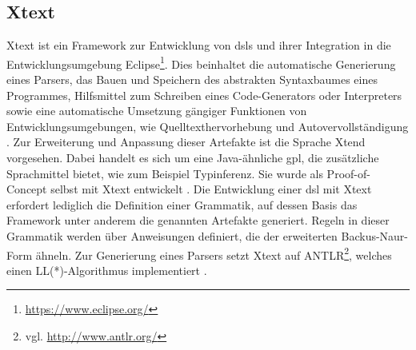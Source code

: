\subsection{Xtext}
    \label{section:solutionDetailsDslXtext}
    Xtext ist ein Framework zur Entwicklung von \glspl{dsl} und ihrer Integration
    in die Entwicklungsumgebung Eclipse\footnote{\url{https://www.eclipse.org/}}.
    Dies beinhaltet die automatische Generierung eines Parsers,
    das Bauen und Speichern des abstrakten Syntaxbaumes eines Programmes,
    Hilfsmittel zum Schreiben eines Code-Generators oder Interpreters
    sowie eine automatische Umsetzung gängiger Funktionen von
    Entwicklungsumgebungen, wie Quelltexthervorhebung und Autovervollständigung
    \cite[Kapitel 1]{bettini:xtext}.
    Zur Erweiterung und Anpassung dieser Artefakte ist die Sprache Xtend vorgesehen.
    Dabei handelt es sich um eine Java-ähnliche \gls{gpl},
    die zusätzliche Sprachmittel bietet, wie zum Beispiel Typinferenz.
    Sie wurde als Proof-of-Concept selbst mit Xtext entwickelt
    \cite[Kapitel 3]{bettini:xtext}.
    Die Entwicklung einer \gls{dsl} mit Xtext erfordert lediglich die Definition
    einer Grammatik, auf dessen Basis das Framework unter anderem die genannten 
    Artefakte generiert.
    Regeln in dieser Grammatik werden über Anweisungen definiert,
    die der erweiterten Backus-Naur-Form ähneln.
    Zur Generierung eines Parsers setzt Xtext auf
    ANTLR\footnote{vgl. \url{http://www.antlr.org/}},
    welches einen LL(*)-Algorithmus implementiert
    \cite{xtext:documentation,parr:antlr}.
